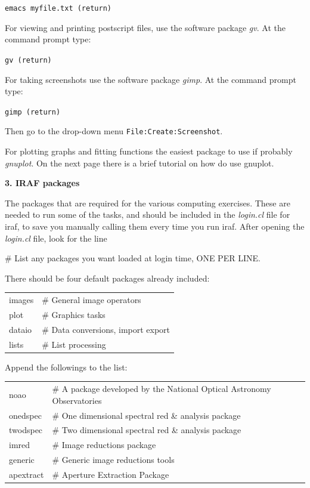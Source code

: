 \documentclass[12pt]{article}
\begin{document}
{\tt emacs myfile.txt (return)}         

For viewing and printing postscript files, use the software package
{\it gv}. At the command prompt type:

{\tt gv (return)}

For taking screenshots use the software package {\it gimp}. At the command prompt type:

{\tt gimp (return)}

Then go to the drop-down menu {\tt File:Create:Screenshot}.

For plotting graphs and fitting functions the easiest package to use
if probably {\it gnuplot}. On the next page there is a brief tutorial
on how do use gnuplot.\\

\newpage
\begin{center}
{\large{\bf 3. IRAF packages}}
\end{center}

The packages that are required for the various computing exercises.  These are needed to run some of the tasks, and should be included in the {\it login.cl} file for {\sc iraf}, to save you manually calling them every time you run {\sc iraf}. After opening the {\it login.cl} file, look for the line 

{\sc \# List any packages you want loaded at login time, ONE PER LINE.}

There should be four default packages already included:

\begin{tabular}{ll}
{\sc images}          &\# General image operators\\
{\sc plot}            &\# Graphics tasks\\
{\sc dataio}          &\# Data conversions, import export\\
{\sc lists}           &\# List processing
\end{tabular}

Append the followings to the list:

\begin{tabular}{ll}
{\sc noao}            &\# A package developed by the National Optical Astronomy Observatories\\
{\sc onedspec}        &\# One dimensional spectral red \& analysis package\\
{\sc twodspec}        &\# Two dimensional spectral red \& analysis package\\
{\sc imred}           &\# Image reductions package\\
{\sc generic}         &\# Generic image reductions tools\\
{\sc apextract}       &\# Aperture Extraction Package
\end{tabular}
\end{document}
